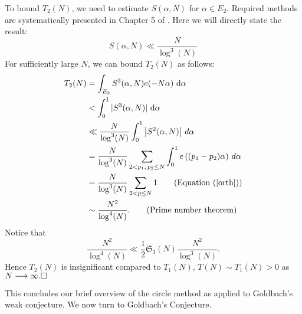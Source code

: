 \documentclass{article}
\begin{document}
To bound $T_2(N)$, we need to estimate $S(\alpha, N)$ for $\alpha \in E_2$. Required methods are systematically presented in Chapter 5 of \cite{pan}. Here we will directly state the result:
\begin{equation*}
    S(\alpha, N) \ll \frac{N}{\log^3(N)}
\end{equation*}
For sufficiently large $N$, we can bound $T_2(N)$ as follows: 
\begin{align*}
T_2(N) &= \int_{E_2} S^3(\alpha, N)e(-N\alpha)\ \mathrm{d}\alpha\\
       & < \int_{0}^1 |S^3(\alpha, N)|\ \mathrm{d}\alpha\\
       &\ll \frac{N}{\log^3 (N)} \int_0^1 \left| S^2(\alpha, N) \right| \, d\alpha \\
        &= \frac{N}{\log^3 (N)} \sum_{2 < p_1,\, p_2 \leq N} \int_0^1  e\left((p_1 - p_2)\alpha\right) \, d\alpha \\
        &= \frac{N}{\log^3 (N)} \sum_{2 < p \leq N} 1 \tag{Equation (\ref{orth})}\\
       &\sim \frac{N^2}{\log^4 (N)}. \tag{Prime number theorem}
\end{align*}
Notice that 
\begin{equation*}
    \frac{N^2}{\log^4(N)} \ll \frac{1}{2} \mathfrak{S}_3(N) \frac{N^2}{\log^3 (N)}.
\end{equation*} 
Hence $T_2(N)$ is insignificant compared to $T_1(N)$, $T(N) \sim T_1(N) > 0$ as $N \longrightarrow \infty. \hfill \square$

This concludes our brief overview of the circle method as applied to Goldbach’s weak conjecture. We now turn to Goldbach's Conjecture.
\end{document}
